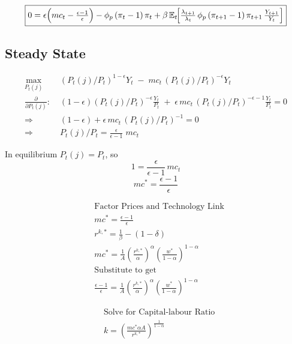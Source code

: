 \documentclass[11pt,preprint]{elsarticle}
\numberwithin{equation}{section}
\numberwithin{figure}{section}
\numberwithin{table}{section}
\begin{document}
\begin{equation}\label{rotemberg_FOC}
\boxed{
  0 = \epsilon\Bigl(mc_t - \tfrac{\epsilon-1}{\epsilon}\Bigr)
      - \phi_p\,(\pi_t - 1)\,\pi_t
      + \beta\,\mathbb{E}_t\!
        \Bigl[
          \tfrac{\lambda_{t+1}}{\lambda_t}\,
          \phi_p\,(\pi_{t+1}-1)\,\pi_{t+1}\,
          \tfrac{Y_{t+1}}{Y_t}
        \Bigr]
}
\end{equation}

\newpage

\subsection{\texorpdfstring{Steady State
\label{steady_state_app}}{Steady State }}\label{steady-state-1}

\begin{align*}
\max_{P_t(j)}\;&(P_t(j)/P_t)^{1-\epsilon}Y_t \;-\; mc_t\,(P_t(j)/P_t)^{-\epsilon}Y_t \\[6pt]
\frac{\partial}{\partial P_t(j)}:\;&(1-\epsilon)(P_t(j)/P_t)^{-\epsilon}\frac{Y_t}{P_t}
\;+\;\epsilon\,mc_t\,(P_t(j)/P_t)^{-\epsilon-1}\frac{Y_t}{P_t}=0 \\[6pt]
\Rightarrow\;&(1-\epsilon)+\epsilon\,mc_t\,(P_t(j)/P_t)^{-1}=0 \\[4pt]
\Rightarrow\;&P_t(j)/P_t=\frac{\epsilon}{\epsilon-1}\;mc_t
\end{align*}

In equilibrium \(P_t(j)=P_t\), so \[
1=\frac{\epsilon}{\epsilon-1}\,mc_t
\] \begin{equation}\label{eq:mc}
mc^*=\frac{\epsilon-1}{\epsilon}
\end{equation}

\begin{align*}
& \text{Factor Prices and Technology Link} \\
& mc^* = \frac{\epsilon - 1}{\epsilon} \\
& r^{k,*} = \frac{1}{\beta} - (1 - \delta) \\
& mc^* = \frac{1}{A} \left( \frac{r^{k,*}}{\alpha} \right)^{\alpha}
            \left( \frac{w^*}{1-\alpha} \right)^{1-\alpha} \\
& \text{Substitute to get} \\
& \frac{\epsilon - 1}{\epsilon}
  = \frac{1}{A} \left( \frac{r^{k,*}}{\alpha} \right)^{\alpha}
    \left( \frac{w^*}{1-\alpha} \right)^{1-\alpha}
\end{align*}

\begin{align*}
& \text{Solve for Capital-labour Ratio} \\
& k = \left(\frac{mc^*\alpha A}{r^{k,*}}\right)^{\!\frac{1}{1-\alpha}}
\end{align*}
\end{document}
